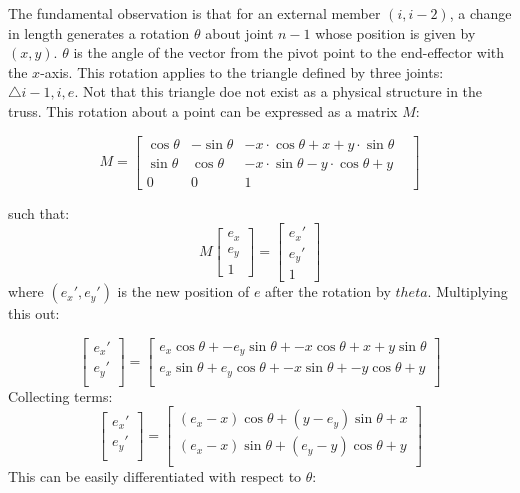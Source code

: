 \documentclass[11pt]{article}
\begin{document}
The fundamental observation is that for an external member $(i,i-2)$, a change in length generates a rotation $\theta$ about joint $n-1$
whose position is given by $(x,y)$. $\theta$ is the angle of the vector from the pivot point to the end-effector with the $x$-axis.
This rotation applies to the triangle defined by three joints: $\triangle i-1,i,e$. Not that this triangle doe not exist as a physical
structure in the truss. This rotation about a point can be expressed as a matrix $M$:

\[
M = 
\begin{bmatrix}
    \cos{\theta} & -\sin{\theta} & -x \cdot \cos{\theta} + x + y \cdot \sin{\theta}  \\
    \sin{\theta} & \cos{\theta} & -x \cdot \sin{\theta} - y \cdot \cos{\theta} + y  \\
    0 & 0 & 1 & 
\end{bmatrix}
\]

such that:
\[
M \begin{bmatrix}
           e_x \\
           e_y \\
           1
         \end{bmatrix} = \begin{bmatrix}
           e_x' \\
           e_y' \\
           1
         \end{bmatrix}
\]
where $(e_x',e_y')$ is the new position of $e$ after the rotation by $theta$. Multiplying this out:

\[
\begin{bmatrix}
           e_x' \\
           e_y' \\
         \end{bmatrix}
=
\begin{bmatrix}
           e_x \cos{\theta} + -e_y \sin{\theta}  + -x\cos{\theta} + x + y \sin{\theta} \\
           e_x \sin{\theta} + e_y \cos{\theta} + -x\sin{\theta} + - y \cos{\theta} + y \\
         \end{bmatrix}
\]
Collecting terms:
\[
\begin{bmatrix}
           e_x' \\
           e_y' \\
         \end{bmatrix}
=
\begin{bmatrix}
           (e_x  - x) \cos{\theta} + (y - e_y)\sin{\theta}  +  x  \\
           (e_x - x ) \sin{\theta} + (e_y - y)\cos{\theta} +  y \\
         \end{bmatrix}
\]
This can be easily differentiated with respect to $\theta$:
\end{document}
